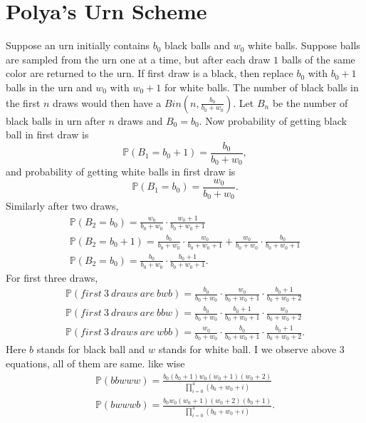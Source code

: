 \documentclass[a4paper,english,12pt]{article}
\begin{document}
\section{Polya's Urn Scheme}
Suppose an urn initially contains $b_0$ black balls and $w_0$ white balls. Suppose balls are sampled from the urn one at a time, but after each draw $1$ balls of the same color are returned to the urn. If first draw is a black, then replace $b_0$ with $b_0+1$ balls in the urn and $w_0$ with $w_0+1$ for white balls. The number of black balls in the first $n$ draws would then have a $Bin(n,\frac{b_0}{b_0+w_0})$.
Let $B_n$ be the number of black balls in urn after $n$ draws and $B_0 = b_0$. Now probability of getting black ball in first draw is
 \begin{equation*}
\mathbb{P}(B_1=b_0+1)= \frac{b_0}{b_0+w_0},
\end{equation*}
and probability of getting white balls in first draw is
 \begin{equation*}
\mathbb{P}(B_1=b_0)= \frac{w_0}{b_0+w_0}.
\end{equation*}
Similarly after two draws,
 \begin{align*}
\mathbb{P}(B_2=b_0)= \frac{w_0}{b_0+w_0} \cdot \frac{w_0+1}{b_0+w_0+1}\\
\mathbb{P}(B_2=b_0+1)= \frac{b_0}{b_0+w_0} \cdot \frac{w_0}{b_0+w_0+1}+\frac{w_0}{b_0+w_0} \cdot \frac{b_0}{b_0+w_0+1}\\
\mathbb{P}(B_2=b_0)= \frac{b_0}{b_0+w_0} \cdot \frac{b_0+1}{b_0+w_0+1}.
\end{align*}
For first three draws,
 \begin{align*}
\mathbb{P}(first \ 3\ draws\ are\ bwb)= \frac{b_0}{b_0+w_0} \cdot \frac{w_0}{b_0+w_0+1} \cdot \frac{b_0+1}{b_0+w_0+2}\\
\mathbb{P}(first \ 3\ draws\ are\ bbw)= \frac{b_0}{b_0+w_0} \cdot \frac{b_0+1}{b_0+w_0+1} \cdot \frac{w_0}{b_0+w_0+2}\\
\mathbb{P}(first \ 3\ draws\ are\ wbb)= \frac{w_0}{b_0+w_0} \cdot \frac{b_0}{b_0+w_0+1} \cdot \frac{b_0+1}{b_0+w_0+2}.
\end{align*}
Here $b$ stands for black ball and $w$ stands for white ball. I we observe above 3 equations, all of them are same. like wise
 \begin{align*}
\mathbb{P}(bbwww)= \frac{b_0(b_0+1)w_0(w_0+1)(w_0+2)}{\prod_{i=0}^4 (b_0+w_0+i)}\\
\mathbb{P}(bwwwb)= \frac{b_0w_0(w_0+1)(w_0+2)(b_0+1)}{\prod_{i=0}^4 (b_0+w_0+i)}.
\end{align*}
\end{document}
